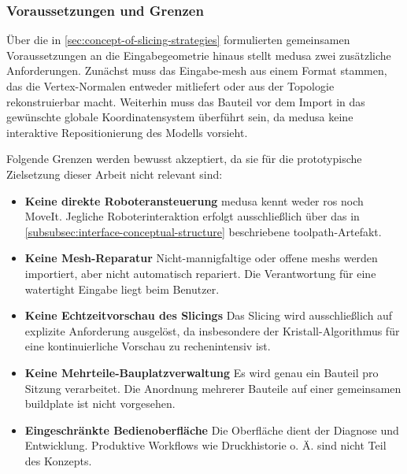             \subsubsection{Voraussetzungen und Grenzen}\label{subsubsec:concept-medusa-assumptions-limits}
                Über die in \cref{sec:concept-of-slicing-strategies} formulierten gemeinsamen Voraussetzungen an die Eingabegeometrie hinaus stellt \ac{medusa} zwei zusätzliche Anforderungen.
                Zunächst muss das Eingabe-\gls{mesh} aus einem Format stammen, das die Vertex-Normalen entweder mitliefert oder aus der Topologie rekonstruierbar macht.
                Weiterhin muss das Bauteil vor dem Import in das gewünschte globale Koordinatensystem überführt sein, da \ac{medusa} keine interaktive Repositionierung des Modells vorsieht.

                Folgende Grenzen werden bewusst akzeptiert, da sie für die prototypische Zielsetzung dieser Arbeit nicht relevant sind:
                \begin{itemize}
                    \item \textbf{Keine direkte Roboteransteuerung}
                        \ac{medusa} kennt weder \ac{ros} noch MoveIt.
                        Jegliche Roboterinteraktion erfolgt ausschließlich über das in \cref{subsubsec:interface-conceptual-structure} beschriebene \gls{toolpath}-Artefakt.
                    \item \textbf{Keine Mesh-Reparatur}
                        Nicht-mannigfaltige oder offene \glspl{mesh} werden importiert, aber nicht automatisch repariert.
                        Die Verantwortung für eine \gls{watertight} Eingabe liegt beim Benutzer.
                    \item \textbf{Keine Echtzeitvorschau des Slicings}
                        Das Slicing wird ausschließlich auf explizite Anforderung ausgelöst, da insbesondere der Kristall-Algorithmus für eine kontinuierliche Vorschau zu rechenintensiv ist.
                    \item \textbf{Keine Mehrteile-Bauplatzverwaltung}
                        Es wird genau ein Bauteil pro Sitzung verarbeitet.
                        Die Anordnung mehrerer Bauteile auf einer gemeinsamen \gls{buildplate} ist nicht vorgesehen.
                    \item \textbf{Eingeschränkte Bedienoberfläche}
                        Die Oberfläche dient der Diagnose und Entwicklung.
                        Produktive Workflows wie Druckhistorie o. Ä. sind nicht Teil des Konzepts.
                \end{itemize}

